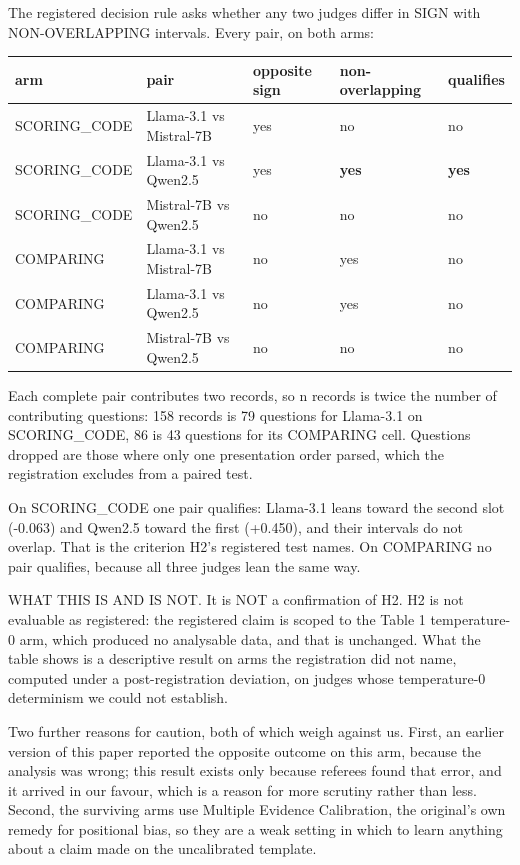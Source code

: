 The registered decision rule asks whether any two judges differ in SIGN with NON-OVERLAPPING
intervals. Every pair, on both arms:

{\def\LTcaptype{none} %
\begin{longtable}[]{@{}lllll@{}}
\toprule\noalign{}
arm & pair & opposite sign & non-overlapping & qualifies \\
\midrule\noalign{}
\endhead
\bottomrule\noalign{}
\endlastfoot
SCORING\_CODE & Llama-3.1 vs Mistral-7B & yes & no & no \\
SCORING\_CODE & Llama-3.1 vs Qwen2.5 & yes & \textbf{yes} & \textbf{yes} \\
SCORING\_CODE & Mistral-7B vs Qwen2.5 & no & no & no \\
COMPARING & Llama-3.1 vs Mistral-7B & no & yes & no \\
COMPARING & Llama-3.1 vs Qwen2.5 & no & yes & no \\
COMPARING & Mistral-7B vs Qwen2.5 & no & no & no \\
\end{longtable}
}

Each complete pair contributes two records, so n records is twice the number of contributing
questions: 158 records is 79 questions for Llama-3.1 on SCORING\_CODE, 86 is 43 questions for its
COMPARING cell. Questions dropped are those where only one presentation order parsed, which the
registration excludes from a paired test.

On SCORING\_CODE one pair qualifies: Llama-3.1 leans toward the second slot (-0.063) and Qwen2.5
toward the first (+0.450), and their intervals do not overlap. That is the criterion H2's registered
test names. On COMPARING no pair qualifies, because all three judges lean the same way.

WHAT THIS IS AND IS NOT. It is NOT a confirmation of H2. H2 is not evaluable as registered: the
registered claim is scoped to the Table 1 temperature-0 arm, which produced no analysable data, and
that is unchanged. What the table shows is a descriptive result on arms the registration did not
name, computed under a post-registration deviation, on judges whose temperature-0 determinism we
could not establish.

Two further reasons for caution, both of which weigh against us. First, an earlier version of this
paper reported the opposite outcome on this arm, because the analysis was wrong; this result exists
only because referees found that error, and it arrived in our favour, which is a reason for more
scrutiny rather than less. Second, the surviving arms use Multiple Evidence Calibration, the
original's own remedy for positional bias, so they are a weak setting in which to learn anything
about a claim made on the uncalibrated template.

